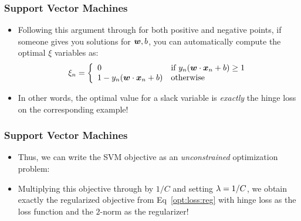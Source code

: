 \documentclass[trans]{beamer}
\begin{document}
\begin{frame}
  \frametitle{Support Vector Machines}
\begin{itemize}
\item 
Following this argument through for both positive and negative points,
if someone gives you solutions for ${\boldsymbol{w}},b$, you can automatically
compute the optimal $\xi$ variables as:
%
\begin{equation}
  \xi_n = \left\{\begin{array}{ll}
    0 & \text{if } y_n({\boldsymbol{w}} \cdot {\boldsymbol{x}}_n+b) \geq 1 \\
    1 - y_n({\boldsymbol{w}} \cdot {\boldsymbol{x}}_n+b) & \text{otherwise}\end{array}\right.
\end{equation}
%
\item In other words, the optimal value for a slack variable is
\emph{exactly} the hinge loss on the corresponding example!  
\end{itemize}
\end{frame}
\begin{frame}
  \frametitle{Support Vector Machines}
\begin{itemize}
\item 
Thus, we
can write the SVM objective as an \emph{unconstrained} optimization
problem:
%
%
\item Multiplying this objective through by $1/C$ and setting $\lambda=1/C$, we obtain exactly the
regularized objective from Eq~\eqref{opt:loss:reg} with hinge loss as
the loss function and the $2$-norm as the regularizer!
\end{itemize}
\end{frame}


%
%
%
\end{document}
